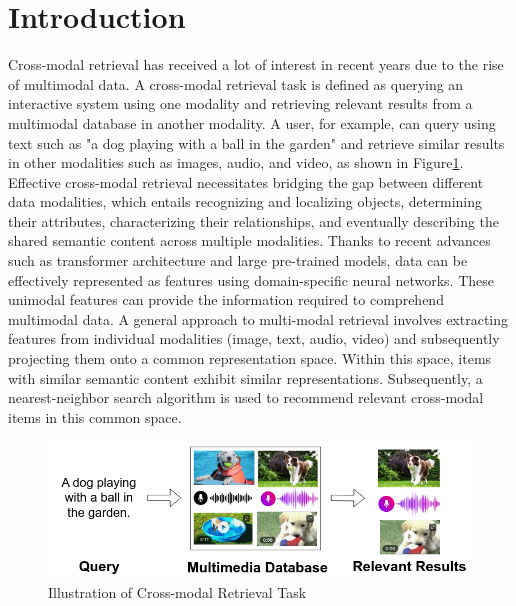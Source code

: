 \section{Introduction} \label{sec:intro}
Cross-modal retrieval has received a lot of interest in recent years due to the rise of multimodal data. A cross-modal retrieval task is defined as querying an interactive system using one modality and retrieving relevant results from a multimodal database in another modality. A user, for example, can query using text such as "a dog playing with a ball in the garden" and retrieve similar results in other modalities such as images, audio, and video, as shown in Figure\ref{fig:cmr_task}. Effective cross-modal retrieval necessitates bridging the gap between different data modalities, which entails recognizing and localizing objects, determining their attributes, characterizing their relationships, and eventually describing the shared semantic content across multiple modalities.  Thanks to recent advances such as transformer architecture and large pre-trained models, data can be effectively represented as features using domain-specific neural networks. These unimodal features can provide the information required to comprehend multimodal data. A general approach to multi-modal retrieval involves extracting features from individual modalities (image, text, audio, video) and subsequently projecting them onto a common representation space. Within this space, items with similar semantic content exhibit similar representations. Subsequently, a nearest-neighbor search algorithm is used to recommend relevant cross-modal items in this common space.

\begin{figure}[h]
    \centering
    \includegraphics[width=\textwidth]{Figures/task.png}
    \caption{Illustration of Cross-modal Retrieval Task}
    \label{fig:cmr_task}
\end{figure}

